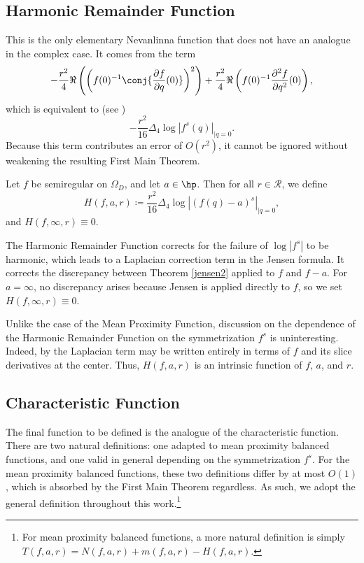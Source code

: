 \documentclass{amsart}
\begin{document}
\subsection{Harmonic Remainder Function}

This is the only elementary Nevanlinna function that does not have an analogue in the complex case. It comes from the term \[-\frac{r^2}{4}\Re \left(\left(f(0)^{-1}\conj{\frac{\partial f}{\partial q}(0)}\right)^2\right)+\frac {r^2}4\Re\left(f(0)^{-1}\frac{\partial^2f}{\partial q^2}(0)\right),\] which is equivalent to (see \cite[Proposition 8]{perottiJensen2019}) \[-\frac{r^2}{16}\Delta_4\log |f^s(q)|_{\mid q=0}.\] Because this term contributes an error of $O(r^2)$, it cannot be ignored without weakening the resulting First Main Theorem. 

\begin{defin}\label{def:HarmonicRemainderFunction}
     Let $f$ be semiregular on $\Omega_D$, and let $a\in\hp$. Then for all $r\in \mathcal{R}$, we define \[H(f,a,r)\coloneq \frac{r^2}{16}\Delta_4\log \left|(f(q)-a)^s\right|_{\mid q=0},\] and $H(f,\infty,r)\equiv0$.
\end{defin}

The Harmonic Remainder Function corrects for the failure of $\log|f^s|$ to be harmonic, which leads to a Laplacian correction term in the Jensen formula. It corrects the discrepancy between Theorem \ref{jensen2} applied to \(f\) and \(f-a\). For \(a=\infty\), no discrepancy arises because Jensen is applied directly to \(f\), so we set \(H(f,\infty,r)\equiv0\). 

Unlike the case of the Mean Proximity Function, discussion on the dependence of the Harmonic Remainder Function on the symmetrization $f^s$ is uninteresting. Indeed, by \cite[Proposition 8]{perottiJensen2019} the Laplacian term may be written entirely in terms of $f$ and its slice derivatives at the center. Thus, $H(f,a,r)$ is an intrinsic function of $f$, $a$, and $r$. 

\subsection{Characteristic Function}

The final function to be defined is the analogue of the characteristic function. There are two natural definitions: one adapted to mean proximity balanced functions, and one valid in general depending on the symmetrization $f^s$. For the mean proximity balanced functions, these two definitions differ by at most $O(1)$, which is absorbed by the First Main Theorem regardless. As such, we adopt the general definition throughout this work.\footnote{For mean proximity balanced functions, a more natural definition is simply $T(f,a,r)=N(f,a,r)+m(f,a,r)-H(f,a,r)$.} 
\end{document}
